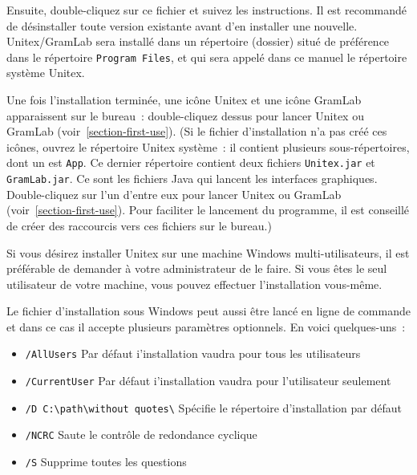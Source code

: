 \begin{flushleft}
{\tt \UnitexPackageWin{}}
{\tt \UnitexPackageWinSF{}}
\end{flushleft}

\noindent Ensuite, double-cliquez sur ce fichier et suivez les instructions. Il est recommandé de désinstaller
toute version existante avant d'en installer une nouvelle. Unitex/GramLab sera installé
dans un répertoire (dossier) situé
de préférence dans le répertoire  \verb+Program Files+, et qui sera appelé dans ce manuel
le répertoire système Unitex.

\bigskip
\noindent Une fois l'installation terminée, une icône Unitex et une icône GramLab apparaissent
sur le bureau~: double-cliquez dessus pour lancer Unitex ou GramLab (voir~\ref{section-first-use}).
(Si le fichier d'installation n'a pas créé ces icônes, ouvrez le répertoire Unitex système~: il contient
plusieurs sous-répertoires, dont un est \verb+App+.  Ce dernier répertoire contient deux fichiers
\verb+Unitex.jar+ et \verb+GramLab.jar+.
 Ce sont les fichiers Java qui lancent les interfaces graphiques. Double-cliquez sur l'un d'entre eux
pour lancer Unitex ou GramLab (voir~\ref{section-first-use}).
Pour faciliter le lancement du programme, il est conseillé de créer des raccourcis vers ces fichiers sur le bureau.)

\bigskip
\noindent Si vous désirez installer Unitex sur une machine Windows multi-utilisateurs, il est
préférable de demander à votre administrateur de le faire. Si vous êtes le seul utilisateur de
votre machine, vous pouvez effectuer l’installation vous-même.

\bigskip
\begin{samepage}
\noindent Le fichier d'installation sous Windows peut aussi être lancé en ligne de commande et dans ce cas
il accepte plusieurs paramètres optionnels. En voici quelques-uns~:

\begin{itemize}
\itemsep1pt\parskip0pt
\item
  \texttt{/AllUsers} \hspace{.15in} Par défaut i'installation vaudra pour tous les utilisateurs\\
\item
  \texttt{/CurrentUser} \hspace{.15in} Par défaut i'installation vaudra pour l'utilisateur seulement\\
\item
  \texttt{/D C:\textbackslash{}path\textbackslash{}without quotes\textbackslash{}} \hspace{.15in}
  Spécifie le répertoire d'installation par défaut\\
\item
  \texttt{/NCRC} \hspace{.15in} Saute le contrôle de redondance cyclique\\
\item
  \texttt{/S} \hspace{.15in} Supprime toutes les questions
\end{itemize}
\end{samepage}

